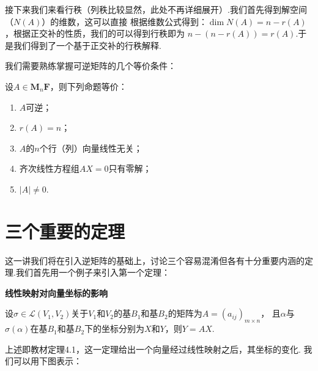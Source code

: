 接下来我们来看行秩（列秩比较显然，此处不再详细展开）.我们首先得到解空间（$N(A)$）的维数，这可以直接
根据维数公式得到：$\dim N(A) =n-r(A)$，根据正交补的性质，我们的可以得到行秩即为
$n-(n-r(A))=r(A)$.于是我们得到了一个基于正交补的行秩解释.

我们需要熟练掌握可逆矩阵的几个等价条件：
\begin{theorem}
    设$A \in \mathbf{M}_n{\mathbf{F}}$，则下列命题等价：
    \begin{enumerate}
        \item $A$可逆；

        \item $r(A)=n$；

        \item $A$的$n$个行（列）向量线性无关；

        \item 齐次线性方程组$AX=0$只有零解；

        \item $|A|\neq 0$.
    \end{enumerate}
\end{theorem}

\section{三个重要的定理}
这一讲我们将在引入逆矩阵的基础上，讨论三个容易混淆但各有十分重要内涵的定理.我们首先用一个例子来引入第一个定理：
\begin{example}
    
\end{example}

\begin{theorem} \label{thm:6:线性映射对向量坐标的影响}
    \textbf{\heiti 线性映射对向量坐标的影响}

    设$\sigma \in \mathcal{L}(V_1,V_2)$关于$V_1$和$V_2$的基$B_1$和基$B_2$的矩阵为$A=(a_{ij})_{m \times n}$，
    且$\alpha$与$\sigma(\alpha)$在基$B_1$和基$B_2$下的坐标分别为$X$和$Y$，则$Y=AX$.
\end{theorem}
上述即教材定理4.1，这一定理给出一个向量经过线性映射之后，其坐标的变化. 我们可以用下图表示：

\begin{figure}[htbp]
    \centering
\end{figure}

